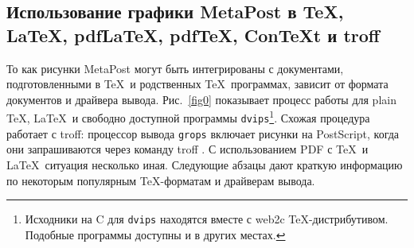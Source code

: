 \documentclass{article} %
\def\ttindex#1{{\tt #1}\index{#1?\texttt{#1}}}
\def\ttt{\texttt}  %
\begin{document}
\subsection{Использование графики MetaPost в \TeX, \LaTeX, pdf\LaTeX, pdf\TeX, Con\TeX{}t и troff}
\label{Dteximport}

То как рисунки MetaPost могут быть интегрированы с документами, 
подготовленными в \TeX\ и родственных \TeX\ программах, зависит от 
формата документов и драйвера вывода.
Рис.~\ref{fig0} показывает процесс работы для plain \TeX, \LaTeX\ и 
свободно доступной программы \ttindex{dvips}\footnote{Исходники на C для 
\ttt{dvips} находятся вместе с web2c \TeX-дистрибутивом.  Подобные 
программы доступны и в других местах.}.
Схожая процедура работает с troff: процессор вывода \ttt{grops} включает  рисунки на PostScript, когда они запрашиваются через команду troff
\ttt{\string\X}. 
С использованием PDF с \TeX\ и \LaTeX\ ситуация несколько иная.
Следующие абзацы дают краткую информацию по некоторым популярным 
\TeX-форматам и драйверам вывода.
\end{document}
